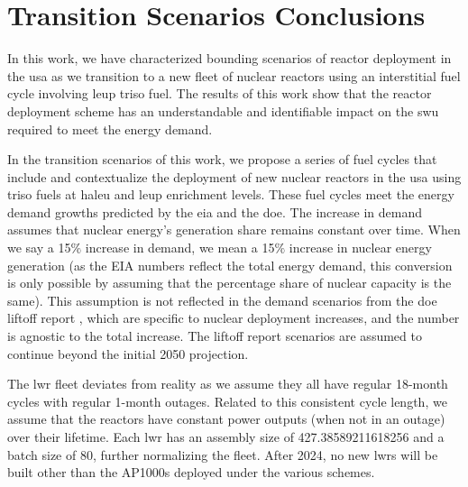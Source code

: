 \section{Transition Scenarios Conclusions}
\label{sec:dep_conc}


In this work, we have characterized bounding scenarios of reactor deployment in the \gls{usa} as we transition to a new fleet of nuclear reactors using an interstitial fuel cycle involving \gls{leup} \gls{triso} fuel. The results of this work show that the reactor deployment scheme has an understandable and identifiable impact on the \gls{swu} required to meet the energy demand.

In the transition scenarios of this work, we propose a series of fuel cycles that include and contextualize the deployment of new nuclear reactors in the \gls{usa} using \gls{triso} fuels at \gls{haleu} and \gls{leup} enrichment levels. These fuel cycles meet the energy demand growths predicted by the \gls{eia} and the \gls{doe}. The increase in demand assumes that nuclear energy's generation share remains constant over time. When we say a 15$\%$ increase in demand, we mean a 15$\%$ increase in nuclear energy generation (as the EIA numbers \cite{eia_aeo_2023} reflect the total energy demand, this conversion is only possible by assuming that the percentage share of nuclear capacity is the same). This assumption is not reflected in the demand scenarios from the \gls{doe} liftoff report \cite{julie_liftoff_pathways_2024}, which are specific to nuclear deployment increases, and the number is agnostic to the total increase. The liftoff report scenarios are assumed to continue beyond the initial 2050 projection.

The \gls{lwr} fleet deviates from reality as we assume they all have regular 18-month cycles with regular 1-month outages. Related to this consistent cycle length, we assume that the reactors have constant power outputs (when not in an outage) over their lifetime. Each \gls{lwr} has an assembly size of 427.38589211618256 and a batch size of 80,  further normalizing the fleet. After 2024, no new \glspl{lwr} will be built other than the AP1000s deployed under the various schemes.

